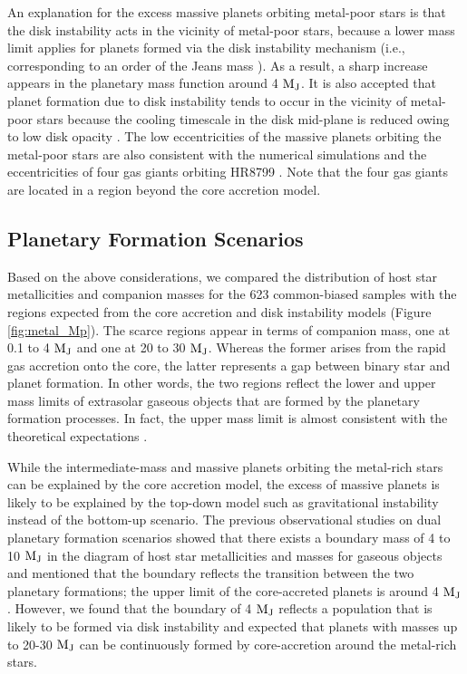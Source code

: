 \documentclass[twocolumn, dvipdfmx]{aastex62}
\begin{document}
\begin{CJK*}{UTF8}{min}
An explanation for the excess massive planets orbiting metal-poor stars is that the disk instability acts in the vicinity of metal-poor stars, because a lower mass limit applies for planets formed via the disk instability mechanism (i.e., corresponding to an order of the Jeans mass \citep{2007ApJ...662.1282M, 2010Wiley}). As a result, a sharp increase appears in the planetary mass function around 4 $\rm M_J$. It is also accepted that planet formation due to disk instability tends to occur in the vicinity of metal-poor stars because the cooling timescale in the disk mid-plane is reduced owing to low disk opacity \citep{2006ApJ...636L.149C, 2007Arizona}. The low eccentricities of the massive planets orbiting the metal-poor stars are also consistent with the numerical simulations \citep{2004ApJ...609.1045M, 2010Wiley, 2011ApJ...731...74B} and the eccentricities of four gas giants orbiting HR8799 \citep{2017A&A...598A..83W}. Note that the four gas giants are located in a region beyond the core accretion model.


\subsection{Planetary Formation Scenarios} \label{subsec:scenarios}

Based on the above considerations, we compared the distribution of host star metallicities and companion masses for the 623 common-biased samples with the regions expected from the core accretion and disk instability models (Figure \ref{fig:metal_Mp}). The scarce regions appear in terms of companion mass, one at 0.1 to 4 $\rm M_J$ and one at 20 to 30 $\rm M_J$. Whereas the former arises from the rapid gas accretion onto the core, the latter represents a gap between binary star and planet formation. In other words, the two regions reflect the lower and upper mass limits of extrasolar gaseous objects that are formed by the planetary formation processes. In fact, the upper mass limit is almost consistent with the theoretical expectations \citep{2007ApJ...667..557T, 2012A&A...541A..97M, 2016ApJ...823...48T}.

While the intermediate-mass and massive planets orbiting the metal-rich stars can be explained by the core accretion model, the excess of massive planets is likely to be explained by the top-down model such as gravitational instability instead of the bottom-up scenario. The previous observational studies on dual planetary formation scenarios \citep{2007A&A...464..779R, 2017A&A...603A..30S, 2018ApJ...853...37S} showed that there exists a boundary mass of 4 to 10 $\rm M_J$ in the diagram of host star metallicities and masses for gaseous objects and mentioned that the boundary reflects the transition between the two planetary formations; the upper limit of the core-accreted planets is around 4 $\rm M_J$. However, we found that the boundary of 4 $\rm M_J$ reflects a population that is likely to be formed via disk instability and expected that planets with masses up to 20-30 $\rm M_J$ can be continuously formed by core-accretion around the metal-rich stars.


\end{CJK*}
\end{document}

